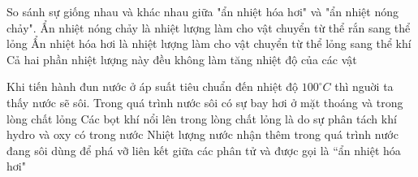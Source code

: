 \begin{ex} 
	So sánh sự giống nhau và khác nhau giữa "ẩn nhiệt hóa hơi" và "ẩn nhiệt nóng chảy".
	{\True Ẩn nhiệt nóng chảy là nhiệt lượng làm cho vật chuyển từ thể rắn sang thể lỏng}
	{\True Ẩn nhiệt hóa hơi là nhiệt lượng làm cho vật chuyển từ thể lỏng sang thể khí}
	{\True Cả hai phần nhiệt lượng này đều không làm tăng nhiệt độ của các vật}
	
\end{ex}





\begin{ex} 
	Khi tiến hành đun nước ở áp suất tiêu chuẩn đến nhiệt độ $100^\circ C$ thì nguời ta thấy nước sẽ sôi.
	{\True Trong quá trình nước sôi có sự bay hơi ở mặt thoáng và trong lòng chất lỏng}
	{Các bọt khí nổi lên trong lòng chất lỏng là do sự phân tách khí hydro và oxy có trong nước}
	{\True Nhiệt lượng nước nhận thêm trong quá trình nước đang sôi dùng để phá vỡ liên kết giữa các phân tử và được gọi là “ẩn nhiệt hóa hơi"}
\end{ex}



